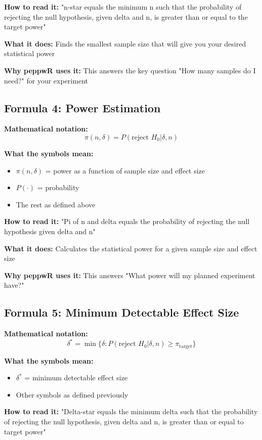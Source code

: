 \documentclass[11pt]{article}
\begin{document}
\textbf{How to read it:} "n-star equals the minimum n such that the probability of rejecting the null hypothesis, given delta and n, is greater than or equal to the target power"

\textbf{What it does:} Finds the smallest sample size that will give you your desired statistical power

\textbf{Why peppwR uses it:} This answers the key question "How many samples do I need?" for your experiment

\subsection{Formula 4: Power Estimation}

\textbf{Mathematical notation:}
\[\pi(n, \delta) = P(\text{reject } H_0 | \delta, n)\]

\textbf{What the symbols mean:}
\begin{itemize}
\item $\pi(n, \delta)$ = power as a function of sample size and effect size
\item $P(\cdot)$ = probability
\item The rest as defined above
\end{itemize}

\textbf{How to read it:} "Pi of n and delta equals the probability of rejecting the null hypothesis given delta and n"

\textbf{What it does:} Calculates the statistical power for a given sample size and effect size

\textbf{Why peppwR uses it:} This answers "What power will my planned experiment have?"

\subsection{Formula 5: Minimum Detectable Effect Size}

\textbf{Mathematical notation:}
\[\delta^* = \min\{\delta : P(\text{reject } H_0 | \delta, n) \geq \pi_{\text{target}}\}\]

\textbf{What the symbols mean:}
\begin{itemize}
\item $\delta^*$ = minimum detectable effect size
\item Other symbols as defined previously
\end{itemize}

\textbf{How to read it:} "Delta-star equals the minimum delta such that the probability of rejecting the null hypothesis, given delta and n, is greater than or equal to target power"
\end{document}
